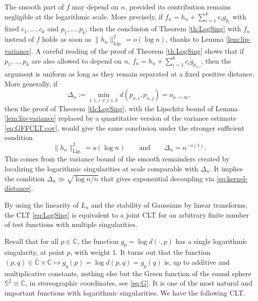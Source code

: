 \documentclass[10pt,reqno]{amsart}
\numberwithin{equation}{section}
\numberwithin{figure}{section}
\theoremstyle{plain}
\newcommand{\<}{\langle}
\renewcommand{\>}{\rangle}
\begin{document}
The smooth part of $f$ may depend on \(n\), provided its contribution remains negligible
at the logarithmic scale. More precisely, if $f_n=h_n+\sum_{i=1}^k c_i g_{p_i}$
with fixed $c_1,\ldots,c_k$ and $p_1,\ldots,p_k$, then the conclusion of Theorem \ref{th:LogSing} with $f_n$ instead of $f$ holds as soon as $\|h_n\|_{\mathrm{Lip.}}^2=o(\log n)$, thanks to Lemma \ref{lem:lip-variance}. 
A careful reading of the proof of Theorem \ref{th:LogSing} shows that if $p_1,\ldots,p_k$ are also allowed to depend on $n$, $f_n=h_n+\sum_{i=1}^kc_ig_{p_{n,i}}$, then the argument is uniform as long as they remain separated at a fixed positive distance. More generally, if 
\[
\Delta_n:=\min_{1\leq i\neq j\leq k}d(p_{n,i},p_{n,j})=o_{n\to\infty},
\]
then the proof of Theorem \ref{th:LogSing}, with the Lipschitz bound of Lemma \ref{lem:lip-variance} replaced by a quantitative version of the variance estimate \eqref{eq:GFFCLT:cov}, would give the same conclusion under the stronger sufficient condition 
\begin{equation}
      \|h_n\|_{\mathrm{Lip.}}^2=o(\log n)
      \qquad\text{and}\qquad
      \Delta_n=n^{-o(1)}.
\end{equation}
This comes from the variance bound of the smooth remainders created by
localizing the logarithmic singularities at scale comparable with
$\Delta_n$. It implies the condition $\Delta_n \gg \sqrt{\log n/n}$ that gives exponential decoupling via \eqref{eq:kernel-distance}. 
%

By using the linearity of $L_n$ and the stability of Gaussians by linear transforms, the CLT \eqref{eq:LogSing} is equivalent to a joint CLT for an arbitrary finite number of test functions with multiple singularities. 

\bigskip

Recall that for all $p\in\overline{\mathbb{C}}$, the function $g_p=\log d(\cdot,p)$ has a single logarithmic singularity, at point $p$, with weight $1$. It turns out that the function $(p,q)\in\overline{\mathbb{C}}\times\overline{\mathbb{C}}\mapsto g_q(p)=\log d(p,q)=g_p(q)$ is, up to additive and multiplicative constants, nothing else but the Green function of the round sphere $\mathbb{S}^2\equiv\overline{\mathbb{C}}$, in stereographic coordinates, see \eqref{eq:G}. It is one of the most natural and important functions with logarithmic singularities.
%
%
%
%
We have the following CLT.
\end{document}
